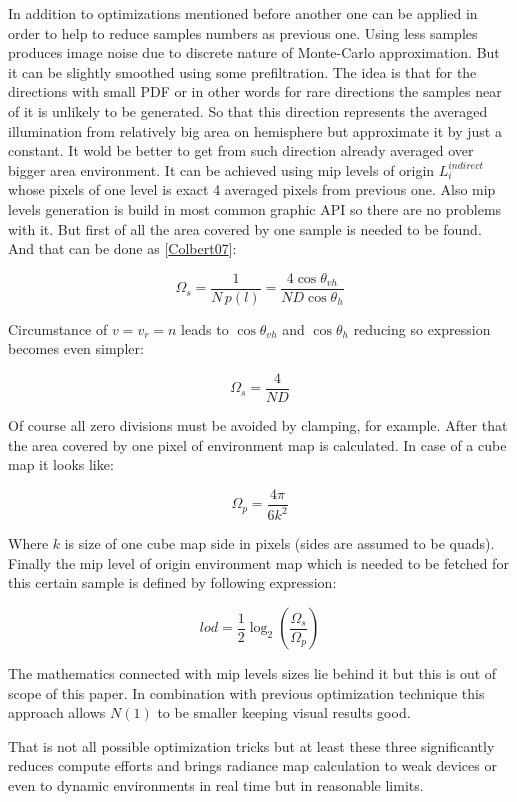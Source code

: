 In addition to optimizations mentioned before another one can be applied in order to help to reduce samples numbers as previous one. Using less samples produces image noise due to discrete nature of Monte-\/\+Carlo approximation. But it can be slightly smoothed using some prefiltration. The idea is that for the directions with small P\+DF or in other words for rare directions the samples near of it is unlikely to be generated. So that this direction represents the averaged illumination from relatively big area on hemisphere but approximate it by just a constant. It wold be better to get from such direction already averaged over bigger area environment. It can be achieved using mip levels of origin $L_i^{indirect}$ whose pixels of one level is exact 4 averaged pixels from previous one. Also mip levels generation is build in most common graphic A\+PI so there are no problems with it. But first of all the area covered by one sample is needed to be found. And that can be done as \mbox{[}\hyperlink{specification__pbr_math_Colbert07}{Colbert07}\mbox{]}\+:

\[\Omega_s = \frac{1}{N\,p(l)} = \frac{4\cos\theta_{vh}}{ND\cos\theta_h}\]

Circumstance of $v = v_r = n$ leads to $\cos\theta_{vh}$ and $\cos\theta_h$ reducing so expression becomes even simpler\+:

\[\Omega_s =\frac{4}{ND}\]

Of course all zero divisions must be avoided by clamping, for example. After that the area covered by one pixel of environment map is calculated. In case of a cube map it looks like\+:

\[\Omega_p = \frac{4\pi}{6k^2}\]

Where $k$ is size of one cube map side in pixels (sides are assumed to be quads). Finally the mip level of origin environment map which is needed to be fetched for this certain sample is defined by following expression\+:

\[lod = \frac{1}{2} \log_2\left(\frac{\Omega_s}{\Omega_p}\right)\]

The mathematics connected with mip levels sizes lie behind it but this is out of scope of this paper. In combination with previous optimization technique this approach allows $N(1)$ to be smaller keeping visual results good.

That is not all possible optimization tricks but at least these three significantly reduces compute efforts and brings radiance map calculation to weak devices or even to dynamic environments in real time but in reasonable limits.

